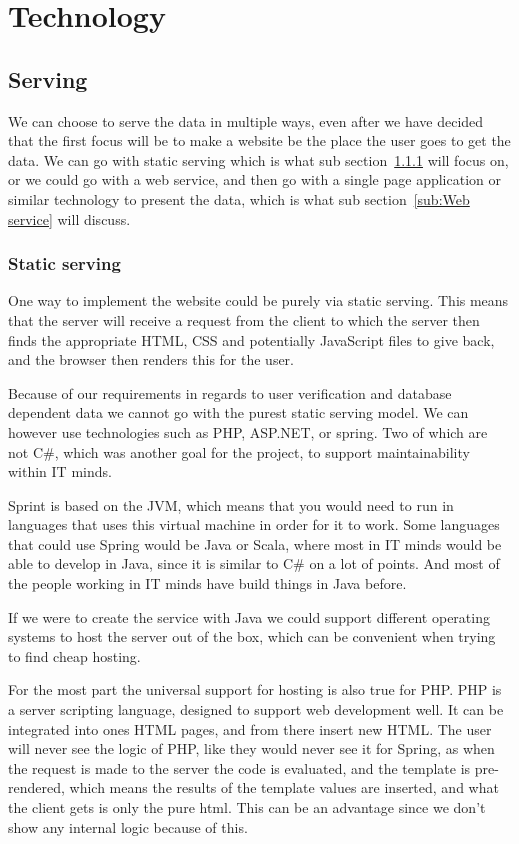 \chapter{Technology}
\label{chap:Technology}

\section{Serving}
\label{sec:Serving}
We can choose to serve the data in multiple ways, even after we have decided that the first focus will be to make a website be the place the user goes to get the data. We can go with static serving which is what sub section~\ref{sub:Static serving} will focus on, or we could go with a web service, and then go with a single page application or similar technology to present the data, which is what sub section~\ref{sub:Web service} will discuss.

\subsection{Static serving}
\label{sub:Static serving}

One way to implement the website could be purely via static serving. This means that the server will receive a request from the client to which the server then finds the appropriate HTML, CSS and potentially JavaScript files to give back, and the browser then renders this for the user.

Because of our requirements in regards to user verification and database dependent data we cannot go with the purest static serving model. We can however use technologies such as PHP, ASP.NET, or spring. Two of which are not C\#, which was another goal for the project, to support maintainability within IT minds.

Sprint is based on the JVM\cite{spring-framework}, which means that you would need to run in languages that uses this virtual machine in order for it to work. Some languages that could use Spring would be Java or Scala, where most in IT minds would be able to develop in Java, since it is similar to C\# on a lot of points. And most of the people working in IT minds have build things in Java before.

If we were to create the service with Java we could support different operating systems to host the server out of the box, which can be convenient when trying to find cheap hosting.

For the most part the universal support for hosting is also true for PHP. PHP is a server scripting language\cite{php-home}, designed to support web development well. It can be integrated into ones HTML pages, and from there insert new HTML. The user will never see the logic of PHP, like they would never see it for Spring, as when the request is made to the server the code is evaluated, and the template is pre-rendered, which means the results of the template values are inserted, and what the client gets is only the pure html. This can be an advantage since we don't show any internal logic because of this.

